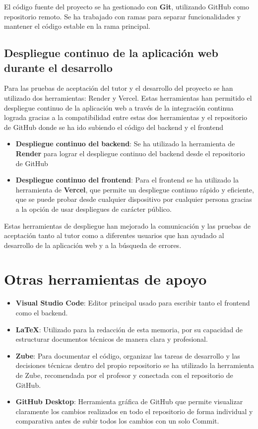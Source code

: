 El código fuente del proyecto se ha gestionado con \textbf{Git}, utilizando GitHub como repositorio remoto. Se ha trabajado con ramas para separar funcionalidades y mantener el código estable en la rama principal.

\subsection{Despliegue continuo de la aplicación web durante el desarrollo}

Para las pruebas de aceptación del tutor y el desarrollo del proyecto se han utilizado dos herramientas: Render y Vercel. Estas herramientas han permitido el despliegue continuo de la aplicación web a través de la integración continua lograda gracias a la compatibilidad entre estas dos herramientas y el repositorio de GitHub donde se ha ido subiendo el código del backend y el frontend

\begin{itemize}
  \item \textbf{Despliegue continuo del backend}: Se ha utilizado la herramienta de \textbf{Render} para lograr el despliegue continuo del backend desde el repositorio de GitHub
  
  \item \textbf{Despliegue continuo del frontend}: Para el frontend se ha utilizado la herramienta de \textbf{Vercel}, que permite un despliegue continuo rápido y eficiente, que se puede probar desde cualquier dispositivo por cualquier persona gracias a la opción de usar despliegues de carácter público.
  
\end{itemize}

Estas herramientas de despliegue han mejorado la comunicación y las pruebas de aceptación tanto al tutor como a diferentes usuarios que han ayudado al desarrollo de la aplicación web y a la búsqueda de errores.

\section{Otras herramientas de apoyo}

\begin{itemize}
  \item \textbf{Visual Studio Code}: Editor principal usado para escribir tanto el frontend como el backend.
  \item \textbf{LaTeX}: Utilizado para la redacción de esta memoria, por su capacidad de estructurar documentos técnicos de manera clara y profesional.
  \item \textbf{Zube}: Para documentar el código, organizar las tareas de desarrollo y las decisiones técnicas dentro del propio repositorio se ha utilizado la herramienta de Zube, recomendada por el profesor y conectada con el repositorio de GitHub.
  \item \textbf{GitHub Desktop}: Herramienta gráfica de GitHub que permite visualizar claramente los cambios realizados en todo el repositorio de forma individual y comparativa antes de subir todos los cambios con un solo Commit.
  
\end{itemize}

